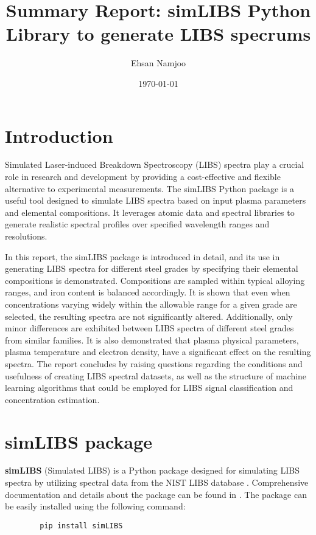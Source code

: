 \documentclass[12pt,a4paper]{article}
\title{Summary Report: simLIBS Python Library to generate LIBS specrums}
\author{Ehsan Namjoo}
\date{\today}
\begin{document}
	
	\maketitle
	\tableofcontents
	\newpage
	\section{Introduction}
	Simulated Laser-induced Breakdown Spectroscopy (LIBS) spectra play a crucial role in research and development by providing a cost-effective and flexible alternative to experimental measurements. The simLIBS Python package is a useful tool designed to simulate LIBS spectra based on input plasma parameters and elemental compositions. It leverages atomic data and spectral libraries to generate realistic spectral profiles over specified wavelength ranges and resolutions.
	
	In this report, the simLIBS package is introduced in detail, and its use in generating LIBS spectra for different steel grades by specifying their elemental compositions is demonstrated. Compositions are sampled within typical alloying ranges, and iron content is balanced accordingly. It is shown that even when concentrations varying widely within the allowable range for a given grade are selected, the resulting spectra are not significantly altered. Additionally, only minor differences are exhibited between LIBS spectra of different steel grades from similar families. It is also demonstrated that plasma physical parameters, plasma temperature and electron density, have a significant effect on the resulting spectra. The report concludes by raising questions regarding the conditions and usefulness of creating LIBS spectral datasets, as well as the structure of machine learning algorithms that could be employed for LIBS signal classification and concentration estimation. 
	
	\section{simLIBS package}
	\textbf{simLIBS} (Simulated LIBS) is a Python package designed for simulating LIBS spectra by utilizing spectral data from the NIST LIBS database \cite{NIST_LIBS}. Comprehensive documentation and details about the package can be found in \cite{simLIBS2024}. The package can be easily installed using the following command:
	
	\vspace{-0.5em}
	\begin{verbatim}
		pip install simLIBS
	\end{verbatim}
	\vspace{-1.5em}
	
\end{document}
